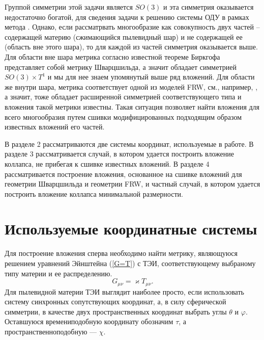 \documentclass[12pt]{article}
\begin{document}
Группой симметрии этой задачи является $SO(3)$ и эта симметрия оказывается недостаточно богатой, для сведения задачи
к решению системы ОДУ в рамках метода \cite{statja27}. Однако, если рассматрвать многообразие как совокупность двух частей --
содержащей материю (сжимающийся пылевидный шар) и не содержащей ее (область вне этого шара), то для каждой
из частей симметрия оказывается выше. Для области вне шара метрика согласно известной теореме Биркгофа
представляет собой метрику Шварцшильда, а значит обладает симметрией $SO(3)\times T^1$ и мы для нее знаем
упомянутый выше ряд вложений. Для области же внутри шара, метрика соответствует одной из моделей FRW, см., например, \cite{landavshic2},
а значит, тоже обладает расширенной симметрией соответствующего типа и вложения такой метрики известны.
Такая ситуация позволяет найти вложения для всего многообразия путем сшивки модифицированных подходящим образом
известных вложений его частей.

В разделе 2 рассматриваются две системы координат, используемые в работе. В разделе 3 рассматривается случай, в котором удается построить вложение коллапса, не прибегая к сшивке известных вложений. В разделе 4 рассматривается построение вложения, основанное на сшивке вложений для геометрии Шварцшильда и геометрии FRW, и частный случай, в котором удается построить вложение коллапса минимальной размерности.

\section{Используемые координатные системы}
Для построение вложения сперва необходимо найти метрику, являющуюся решением уравнений Эйнштейна (\ref{G=T}) с ТЭИ, соответствующему выбраному типу материи и ее распределению.
\begin{equation}
\label{G=T}
	G_{\mu \nu} = \varkappa T_{\mu \nu}.
\end{equation}
Для пылевидной материи ТЭИ выглядит наиболее просто, если использовать систему синхронных сопутствующих координат, а, в силу сферической симметрии, в качестве двух пространственных координат выбрать углы $\theta$ и $\varphi$. Оставшуюся времениподобную координату обозначим $\tau$, а пространственноподобную --- $\chi$. 
\end{document}
